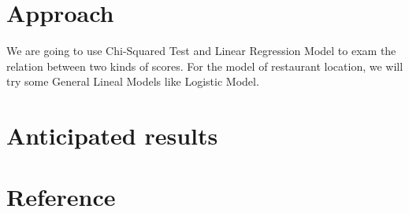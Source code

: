 \documentclass{article}
\begin{document}
\section{Approach}
We are going to use Chi-Squared Test and Linear Regression Model to exam the relation between two kinds of scores. For the model of restaurant location, we will try some General Lineal Models like Logistic Model.

\section{Anticipated results}



\section{Reference}
\end{document}
